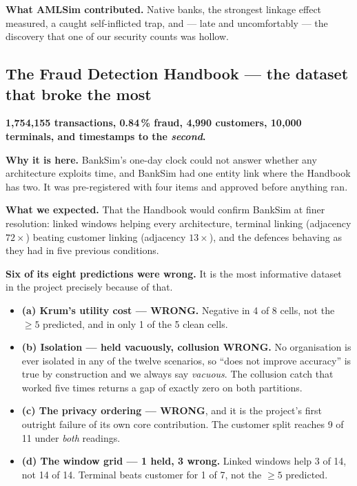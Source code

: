 \documentclass[11pt]{article}
\begin{document}
\textbf{What AMLSim contributed.} Native banks, the strongest linkage effect measured, a caught
self-inflicted trap, and --- late and uncomfortably --- the discovery that one of our security counts was
hollow.

\subsection{The Fraud Detection Handbook --- the dataset that broke the most}

\textbf{1{,}754{,}155 transactions, 0.84\,\% fraud, 4{,}990 customers, 10{,}000 terminals, and timestamps
to the \emph{second}.}

\textbf{Why it is here.} BankSim's one-day clock could not answer whether any architecture exploits time,
and BankSim had one entity link where the Handbook has two. It was pre-registered with four items and
approved before anything ran.

\textbf{What we expected.} That the Handbook would confirm BankSim at finer resolution: linked windows
helping every architecture, terminal linking (adjacency $72\times$) beating customer linking (adjacency
$13\times$), and the defences behaving as they had in five previous conditions.

\textbf{Six of its eight predictions were wrong.} It is the most informative dataset in the project
precisely because of that.

\begin{itemize}\itemsep2pt
  \item \textbf{(a) Krum's utility cost --- WRONG.} Negative in 4 of 8 cells, not the $\ge 5$ predicted,
        and in only 1 of the 5 clean cells.
  \item \textbf{(b) Isolation --- held vacuously, collusion WRONG.} No organisation is ever isolated in
        any of the twelve scenarios, so ``does not improve accuracy'' is true by construction and we
        always say \emph{vacuous}. The collusion catch that worked five times returns a gap of exactly
        zero on both partitions.
  \item \textbf{(c) The privacy ordering --- WRONG}, and it is the project's first outright failure of its
        own core contribution. The customer split reaches 9 of 11 under \emph{both} readings.
  \item \textbf{(d) The window grid --- 1 held, 3 wrong.} Linked windows help 3 of 14, not 14 of 14.
        Terminal beats customer for 1 of 7, not the $\ge 5$ predicted.
\end{itemize}
\end{document}
